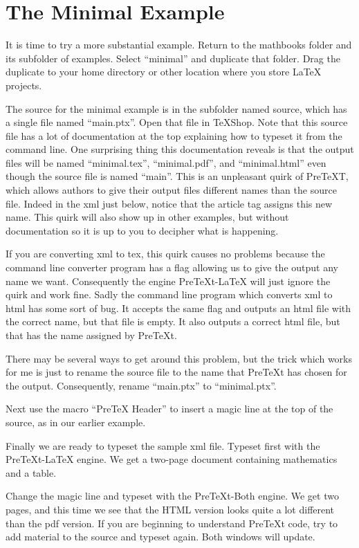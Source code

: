 \documentclass[11pt, oneside]{article}   	%
\begin{document}
\section{The Minimal Example}

It is time to try a more substantial example. Return to the mathbooks folder and its subfolder of examples. Select ``minimal'' and duplicate that folder. Drag the duplicate to your home directory or other location where you store LaTeX projects.

The source for the minimal example is in the subfolder named source, which has a single file named ``main.ptx''. Open that file in TeXShop. Note that this source file has a lot of documentation at the top explaining how to typeset it from the command line. One surprising thing this documentation reveals is that the output files will be named ``minimal.tex'', ``minimal.pdf'', and ``minimal.html''
even though the source file is named ``main''. This is an unpleasant quirk of PreTeXT, which allows authors to give their output files different names than the source file. Indeed in the xml just below, notice that the article tag assigns this new name. This quirk will also show up in other examples, but without documentation so it is up to you to decipher what is happening.

If you are converting xml to tex, this quirk causes no problems because the command line converter program has a flag allowing us to give the output any name we want. Consequently the engine PreTeXt-LaTeX will just ignore the quirk and work fine. Sadly the command line program which converts xml to html has some sort of bug. It accepts the same flag and outputs an html file with the correct name, but that file is empty. It also outputs a correct html file, but that has the name assigned by PreTeXt.

There may be several ways to get around this problem, but the trick which works for me is just to rename the source file to the name that PreTeXt has chosen for the output. Consequently, rename ``main.ptx'' to ``minimal.ptx''.

Next use the macro ``PreTeX Header'' to insert a magic line at the top of the source, as in our earlier example.

Finally we are ready to typeset the sample xml file. Typeset first with the PreTeXt-LaTeX engine. We get a two-page document containing mathematics and a table.

Change the magic line and typeset with the PreTeXt-Both engine.  We get two pages, and this time we see that the HTML version looks quite a lot different than the pdf version. If you are beginning to understand PreTeXt code, try to add material to the source and typeset again. Both windows will update.
\end{document}
